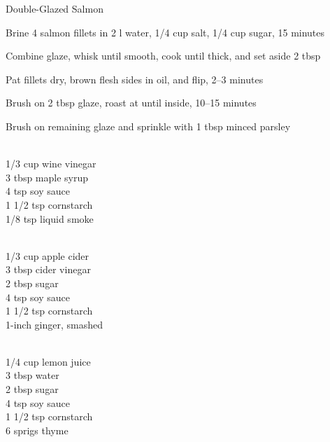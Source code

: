 \begin{densecard}{Double-Glazed Salmon}{}
\begin{steps}
    \item Brine 4 salmon fillets in 2 l water, 1/4 cup salt, 1/4 cup sugar, 15 minutes
    \item Combine glaze, whisk until smooth, cook until thick, and set aside 2 tbsp
    \item Pat fillets dry, brown flesh sides in oil, and flip, 2--3 minutes
    \item Brush on 2 tbsp glaze, roast at  until  inside, 10--15 minutes
    \item Brush on remaining glaze and sprinkle with 1 tbsp minced parsley
\end{steps}
\begin{paracol}{3}
\begin{ingredients}
\\
1/3 cup wine vinegar\\
3 tbsp maple syrup\\
4 tsp soy sauce\\
1 1/2 tsp cornstarch\\
1/8 tsp liquid smoke
\end{ingredients}
\nextcolumn
\begin{ingredients}
\\
1/3 cup apple cider\\
3 tbsp cider vinegar\\
2 tbsp sugar\\
4 tsp soy sauce\\
1 1/2 tsp cornstarch\\
1-inch ginger, smashed
\end{ingredients}
\nextcolumn
\begin{ingredients}
\\
1/4 cup lemon juice\\
3 tbsp water\\
2 tbsp sugar\\
4 tsp soy sauce\\
1 1/2 tsp cornstarch\\
6 sprigs thyme
\end{ingredients}
\end{paracol}
\end{densecard}

